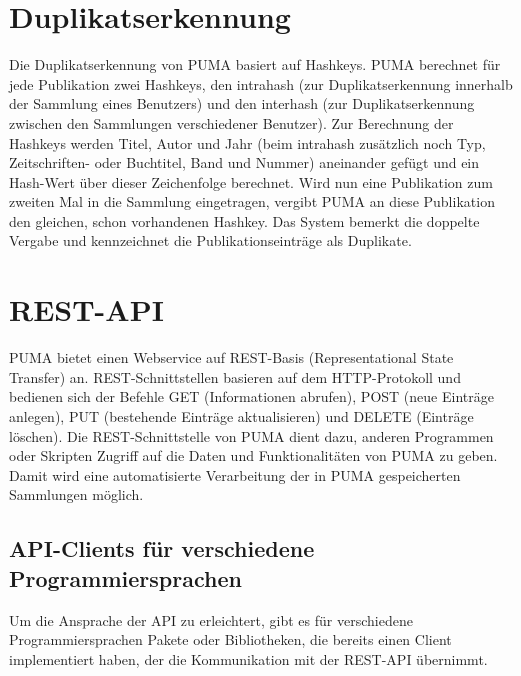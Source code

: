 \section{Duplikatserkennung} 
\label{sec:duplikat}
Die Duplikatserkennung von PUMA basiert auf Hashkeys. PUMA berechnet für jede Publikation zwei Hashkeys, den intrahash (zur Duplikatserkennung innerhalb der Sammlung eines Benutzers) und den interhash (zur Duplikatserkennung zwischen den Sammlungen verschiedener Benutzer). Zur Berechnung der Hashkeys werden Titel, Autor und Jahr (beim intrahash zusätzlich noch Typ, Zeitschriften- oder Buchtitel, Band und Nummer) aneinander gefügt und ein Hash-Wert über dieser Zeichenfolge berechnet. Wird nun eine Publikation zum zweiten Mal in die Sammlung eingetragen, vergibt PUMA an diese Publikation den gleichen, schon vorhandenen Hashkey. Das System bemerkt die doppelte Vergabe und kennzeichnet die Publikationseinträge als Duplikate. 

\section{REST-API}
\label{sec:restApi}
PUMA bietet einen Webservice auf REST-Basis (Representational State Transfer) an. REST-Schnittstellen basieren auf dem HTTP-Protokoll und bedienen sich der Befehle GET (Informationen abrufen), POST (neue Einträge anlegen), PUT (bestehende Einträge aktualisieren) und DELETE (Einträge löschen). Die REST-Schnittstelle von PUMA dient dazu, anderen Programmen oder Skripten Zugriff auf die Daten und Funktionalitäten von PUMA zu geben. Damit wird eine automatisierte Verarbeitung der in PUMA gespeicherten Sammlungen möglich.

\subsection{API-Clients für verschiedene Programmiersprachen}
\label{subsec:apiClients}
Um die Ansprache der API zu erleichtert, gibt es für verschiedene Programmiersprachen Pakete oder Bibliotheken, die bereits einen Client implementiert haben, der die Kommunikation mit der REST-API übernimmt.


